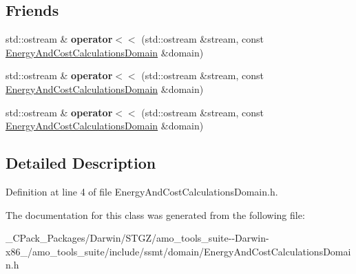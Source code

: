 \subsection*{Friends}
\begin{DoxyCompactItemize}
\item 
\mbox{\label{class_energy_and_cost_calculations_domain_a35d1998691689ec1d9b50856517ebcc3}} 
std\+::ostream \& {\bfseries operator$<$$<$} (std\+::ostream \&stream, const \hyperlink{class_energy_and_cost_calculations_domain}{Energy\+And\+Cost\+Calculations\+Domain} \&domain)
\item 
\mbox{\label{class_energy_and_cost_calculations_domain_a35d1998691689ec1d9b50856517ebcc3}} 
std\+::ostream \& {\bfseries operator$<$$<$} (std\+::ostream \&stream, const \hyperlink{class_energy_and_cost_calculations_domain}{Energy\+And\+Cost\+Calculations\+Domain} \&domain)
\item 
\mbox{\label{class_energy_and_cost_calculations_domain_a35d1998691689ec1d9b50856517ebcc3}} 
std\+::ostream \& {\bfseries operator$<$$<$} (std\+::ostream \&stream, const \hyperlink{class_energy_and_cost_calculations_domain}{Energy\+And\+Cost\+Calculations\+Domain} \&domain)
\end{DoxyCompactItemize}


\subsection{Detailed Description}


Definition at line 4 of file Energy\+And\+Cost\+Calculations\+Domain.\+h.



The documentation for this class was generated from the following file\+:\begin{DoxyCompactItemize}
\item 
\+\_\+\+C\+Pack\+\_\+\+Packages/\+Darwin/\+S\+T\+G\+Z/amo\+\_\+tools\+\_\+suite-\/-\/\+Darwin-\/x86\+\_/amo\+\_\+tools\+\_\+suite/include/ssmt/domain/Energy\+And\+Cost\+Calculations\+Domain.\+h\end{DoxyCompactItemize}
